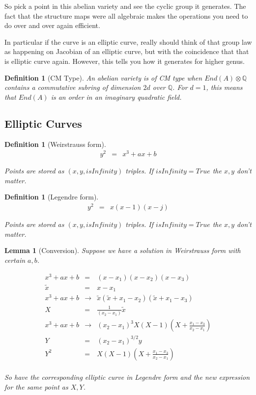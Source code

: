 \documentclass[11pt]{article}
\theoremstyle{change}
\newtheorem{definition}[equation]{Definition}
\newtheorem{lemma}[equation]{Lemma}
\theoremstyle{nonumberplain}
\numberwithin{equation}{section}
\begin{document}
So pick a point in this abelian variety and see the cyclic group it generates. The fact that the structure maps were all algebraic makes the operations you need to do over and over again efficient.

In particular if the curve is an elliptic curve, really should think of that group law as happening on Jacobian of an elliptic curve, but with the coincidence that that is elliptic curve again. However, this tells you how it generates for higher genus.

\begin{definition}[CM Type]
An abelian variety is of CM type when $End (A) \otimes \mathbb{Q}$ contains a commutative subring of dimension $2d$ over $\mathbb{Q}$. For $d=1$, this means that $End(A)$ is an order in an imaginary quadratic field.
\end{definition}

\subsection{Elliptic Curves}

\begin{definition}[Weirstrauss form]
\begin{eqnarray*}
y^2 &=& x^3 + a x + b
\end{eqnarray*}

Points are stored as $(x,y,isInfinity)$ triples. If $isInfinity=True$ the $x,y$ don't matter.

\end{definition}

\begin{definition}[Legendre form]
\begin{eqnarray*}
y^2 &=& x (x-1) (x - j)
\end{eqnarray*}

Points are stored as $(x,y,isInfinity)$ triples. If $isInfinity=True$ the $x,y$ don't matter.
\end{definition}

\begin{lemma}[Conversion]
Suppose we have a solution in Weirstrauss form with certain $a,b$.

\begin{eqnarray*}
x^3 + a x + b &=& (x - x_1) (x - x_2) (x - x_3)\\
\tilde{x} &=& x - x_1\\
x^3 + a x + b &\to& \tilde{x} ( \tilde{x} + x_1 - x_2) (\tilde{x} + x_1 - x_3)\\
X &=& \frac{1}{(x_2 - x_1)}  \tilde{x}\\
x^3 + a x + b &\to& (x_2 - x_1)^{3} X ( X - 1) (X + \frac{x_1 - x_3}{x_2 - x_1})\\
Y &=& (x_2 - x_1)^{3/2} y\\
Y^2 &=& X ( X - 1) (X + \frac{x_1 - x_3}{x_2 - x_1})\\
\end{eqnarray*}

So have the corresponding elliptic curve in Legendre form and the new expression for the same point as $X,Y$.

\end{lemma}
\end{document}
